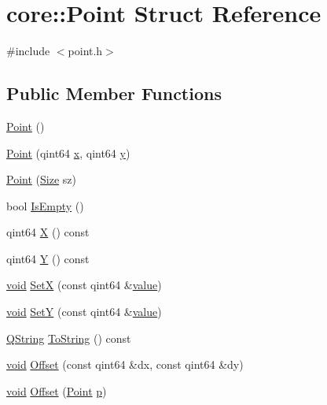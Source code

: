\hypertarget{structcore_1_1_point}{\section{core\-:\-:Point Struct Reference}
\label{structcore_1_1_point}
}


{\ttfamily \#include $<$point.\-h$>$}

\subsection*{Public Member Functions}
\begin{DoxyCompactItemize}
\item 
\hyperlink{group___o_p_map_widget_ga674c2f3c2d11aa89d2c51dc42bdeb88e}{Point} ()
\item 
\hyperlink{group___o_p_map_widget_gad1dcff6c9f2c25281ea28be5eb36e2b1}{Point} (qint64 \hyperlink{glext_8h_a1db9d104e3c2128177f26aff7b46982f}{x}, qint64 \hyperlink{glext_8h_a42315f3ed8fff752bb47fd782309fcfc}{y})
\item 
\hyperlink{group___o_p_map_widget_gad3510c0e0b0ac201ddaced67030e7cdc}{Point} (\hyperlink{structcore_1_1_size}{Size} sz)
\item 
bool \hyperlink{group___o_p_map_widget_ga82d2ada8c2a4cff27b8d1cd67e5b8677}{Is\-Empty} ()
\item 
qint64 \hyperlink{group___o_p_map_widget_gaa80c6ca1d28f90037f40c53e2093cde2}{X} () const 
\item 
qint64 \hyperlink{group___o_p_map_widget_ga15325baf78dea74cc34b00887dd5539b}{Y} () const 
\item 
\hyperlink{group___u_a_v_objects_plugin_ga444cf2ff3f0ecbe028adce838d373f5c}{void} \hyperlink{group___o_p_map_widget_ga3dea470d6276c4049e2aa39b14d637e7}{Set\-X} (const qint64 \&\hyperlink{glext_8h_aa0e2e9cea7f208d28acda0480144beb0}{value})
\item 
\hyperlink{group___u_a_v_objects_plugin_ga444cf2ff3f0ecbe028adce838d373f5c}{void} \hyperlink{group___o_p_map_widget_gae987195d2da22e1c8e4ca161fe9a2269}{Set\-Y} (const qint64 \&\hyperlink{glext_8h_aa0e2e9cea7f208d28acda0480144beb0}{value})
\item 
\hyperlink{group___u_a_v_objects_plugin_gab9d252f49c333c94a72f97ce3105a32d}{Q\-String} \hyperlink{group___o_p_map_widget_gabfd5368c170cc03b85baf6c32c56f11a}{To\-String} () const 
\item 
\hyperlink{group___u_a_v_objects_plugin_ga444cf2ff3f0ecbe028adce838d373f5c}{void} \hyperlink{group___o_p_map_widget_ga6ffa19db824186dac9bac22ebf314e3e}{Offset} (const qint64 \&dx, const qint64 \&dy)
\item 
\hyperlink{group___u_a_v_objects_plugin_ga444cf2ff3f0ecbe028adce838d373f5c}{void} \hyperlink{group___o_p_map_widget_ga31f14855ca1e292676db909b2b0f1c11}{Offset} (\hyperlink{structcore_1_1_point}{Point} \hyperlink{glext_8h_aa5367c14d90f462230c2611b81b41d23}{p})
\end{DoxyCompactItemize}
